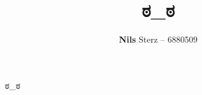 \documentclass{hwrk}
\title{ಠ_ಠ}
\author{\textbf{Nils} Sterz -- 6880509}
\begin{document}
ಠ_ಠ
\end{document}
